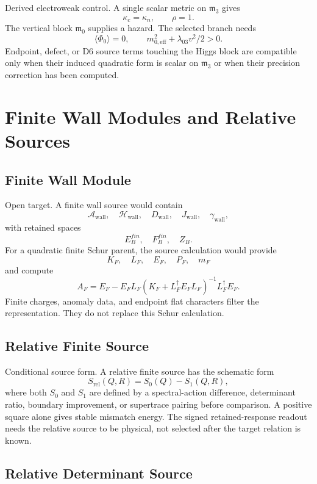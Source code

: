 \documentclass[11pt]{article}
\newcommand{\mzero}{\mathfrak m_0}
\newcommand{\mthree}{\mathfrak m_3}
\begin{document}
Derived electroweak control.  A single scalar metric on \(\mthree\) gives
\[
  \kappa_c=\kappa_n,\qquad \rho=1.
\]
The vertical block \(\mzero\) supplies a hazard.  The selected branch needs
\[
  \langle\Phi_0\rangle=0,\qquad
  m_{0,\mathrm{eff}}^2+\lambda_{03}v^2/2>0.
\]
Endpoint, defect, or D6 source terms touching the Higgs block are
compatible only when their induced quadratic form is scalar on \(\mthree\)
or when their precision correction has been computed.

\section{Finite Wall Modules and Relative Sources}

\subsection{Finite Wall Module}

Open target.  A finite wall source would contain
\[
  \mathcal A_{\mathrm{wall}},\quad
  \mathcal H_{\mathrm{wall}},\quad
  D_{\mathrm{wall}},\quad
  J_{\mathrm{wall}},\quad
  \gamma_{\mathrm{wall}},
\]
with retained spaces
\[
  E_B^{fin},\quad F_B^{fin},\quad Z_B.
\]
For a quadratic finite Schur parent, the source calculation would provide
\[
  K_F,\quad L_F,\quad E_F,\quad P_F,\quad m_F
\]
and compute
\[
  A_F
  =E_F-E_F L_F(K_F+L_F^\dagger E_F L_F)^{-1}L_F^\dagger E_F.
\]
Finite charges, anomaly data, and endpoint flat characters filter the
representation.  They do not replace this Schur calculation.

\subsection{Relative Finite Source}

Conditional source form.  A relative finite source has the schematic form
\[
  S_{\mathrm{rel}}(Q,R)=S_0(Q)-S_1(Q,R),
\]
where both \(S_0\) and \(S_1\) are defined by a spectral-action difference,
determinant ratio, boundary improvement, or supertrace pairing before
comparison.  A positive square alone gives stable mismatch energy.  The
signed retained-response readout needs the relative source to be physical,
not selected after the target relation is known.

\subsection{Relative Determinant Source}
\end{document}
